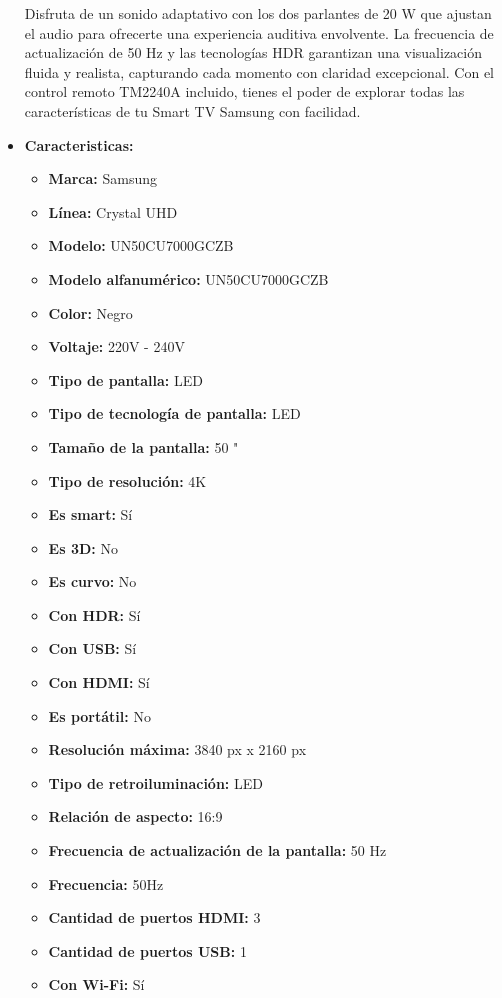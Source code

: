 \documentclass{article}
\begin{document}
\begin{adjustwidth}{2em}{}
\begin{itemize}
Disfruta de un sonido adaptativo con los dos parlantes de 20 W que ajustan el audio para ofrecerte una experiencia auditiva envolvente. La frecuencia de actualización de 50 Hz y las tecnologías HDR garantizan una visualización fluida y realista, capturando cada momento con claridad excepcional. Con el control remoto TM2240A incluido, tienes el poder de explorar todas las características de tu Smart TV Samsung con facilidad.
        \item \textbf{Caracteristicas:} 
        \begin{itemize}
            \item \textbf {Marca:} Samsung
    \item \textbf {Línea:} Crystal UHD
    \item \textbf {Modelo:} UN50CU7000GCZB
    \item \textbf {Modelo alfanumérico:} UN50CU7000GCZB
    \item \textbf {Color:} Negro
    \item \textbf {Voltaje:} 220V - 240V
    \item \textbf {Tipo de pantalla:} LED
    \item \textbf {Tipo de tecnología de pantalla:} LED
    \item \textbf {Tamaño de la pantalla:} 50 "
    \item \textbf {Tipo de resolución:} 4K
    \item \textbf {Es smart:} Sí
    \item \textbf {Es 3D:} No
    \item \textbf {Es curvo:} No
    \item \textbf {Con HDR:} Sí
    \item \textbf {Con USB:} Sí
    \item \textbf {Con HDMI:} Sí
    \item \textbf {Es portátil:} No
    \item \textbf {Resolución máxima:} 3840 px x 2160 px
    \item \textbf {Tipo de retroiluminación:} LED
    \item \textbf {Relación de aspecto:} 16:9
    \item \textbf {Frecuencia de actualización de la pantalla:} 50 Hz
    \item \textbf {Frecuencia:} 50Hz
    \item \textbf {Cantidad de puertos HDMI:} 3
    \item \textbf {Cantidad de puertos USB:} 1
    \item \textbf {Con Wi-Fi:} Sí

\end{itemize}
\end{itemize}
\end{adjustwidth}
\end{document}
